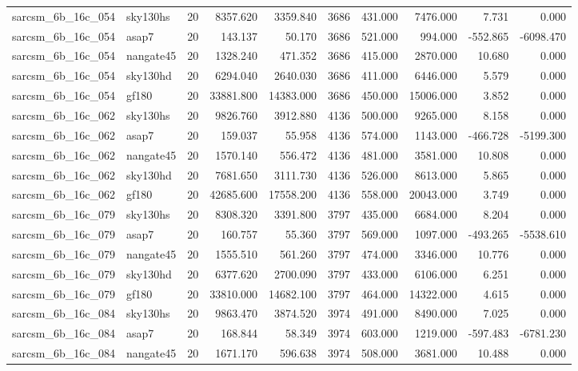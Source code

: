 \begin{tabular}{llrrrrrrrr}
sarcsm\_6b\_16c\_054 & sky130hs & 20 & 8357.620 & 3359.840 & 3686 & 431.000 & 7476.000 & 7.731 & 0.000 \\
sarcsm\_6b\_16c\_054 & asap7 & 20 & 143.137 & 50.170 & 3686 & 521.000 & 994.000 & -552.865 & -6098.470 \\
sarcsm\_6b\_16c\_054 & nangate45 & 20 & 1328.240 & 471.352 & 3686 & 415.000 & 2870.000 & 10.680 & 0.000 \\
sarcsm\_6b\_16c\_054 & sky130hd & 20 & 6294.040 & 2640.030 & 3686 & 411.000 & 6446.000 & 5.579 & 0.000 \\
sarcsm\_6b\_16c\_054 & gf180 & 20 & 33881.800 & 14383.000 & 3686 & 450.000 & 15006.000 & 3.852 & 0.000 \\
sarcsm\_6b\_16c\_062 & sky130hs & 20 & 9826.760 & 3912.880 & 4136 & 500.000 & 9265.000 & 8.158 & 0.000 \\
sarcsm\_6b\_16c\_062 & asap7 & 20 & 159.037 & 55.958 & 4136 & 574.000 & 1143.000 & -466.728 & -5199.300 \\
sarcsm\_6b\_16c\_062 & nangate45 & 20 & 1570.140 & 556.472 & 4136 & 481.000 & 3581.000 & 10.808 & 0.000 \\
sarcsm\_6b\_16c\_062 & sky130hd & 20 & 7681.650 & 3111.730 & 4136 & 526.000 & 8613.000 & 5.865 & 0.000 \\
sarcsm\_6b\_16c\_062 & gf180 & 20 & 42685.600 & 17558.200 & 4136 & 558.000 & 20043.000 & 3.749 & 0.000 \\
sarcsm\_6b\_16c\_079 & sky130hs & 20 & 8308.320 & 3391.800 & 3797 & 435.000 & 6684.000 & 8.204 & 0.000 \\
sarcsm\_6b\_16c\_079 & asap7 & 20 & 160.757 & 55.360 & 3797 & 569.000 & 1097.000 & -493.265 & -5538.610 \\
sarcsm\_6b\_16c\_079 & nangate45 & 20 & 1555.510 & 561.260 & 3797 & 474.000 & 3346.000 & 10.776 & 0.000 \\
sarcsm\_6b\_16c\_079 & sky130hd & 20 & 6377.620 & 2700.090 & 3797 & 433.000 & 6106.000 & 6.251 & 0.000 \\
sarcsm\_6b\_16c\_079 & gf180 & 20 & 33810.000 & 14682.100 & 3797 & 464.000 & 14322.000 & 4.615 & 0.000 \\
sarcsm\_6b\_16c\_084 & sky130hs & 20 & 9863.470 & 3874.520 & 3974 & 491.000 & 8490.000 & 7.025 & 0.000 \\
sarcsm\_6b\_16c\_084 & asap7 & 20 & 168.844 & 58.349 & 3974 & 603.000 & 1219.000 & -597.483 & -6781.230 \\
sarcsm\_6b\_16c\_084 & nangate45 & 20 & 1671.170 & 596.638 & 3974 & 508.000 & 3681.000 & 10.488 & 0.000 \\

\end{tabular}
